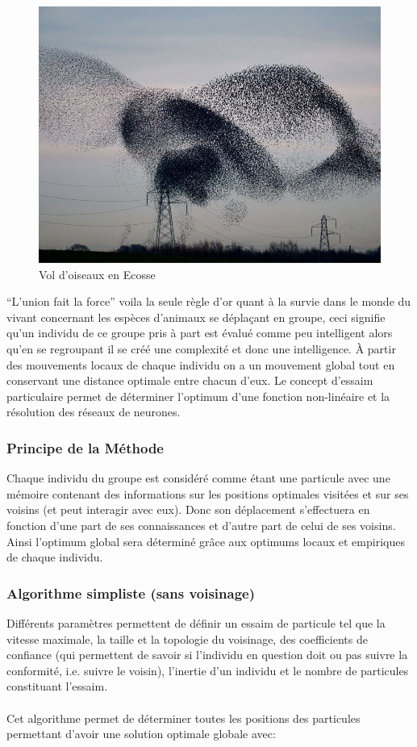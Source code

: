 \documentclass[12pt]{article}
\begin{document}
    \begin{figure}[H]
        \centering\includegraphics[scale=0.4]{vol-groupe-d-oiseaux.jpg}
        \caption{Vol d'oiseaux en Ecosse}
    \end{figure}	

    “L'union fait la force” voila la seule règle d'or quant à la survie dans le monde du vivant concernant les espèces d'animaux se déplaçant en groupe, ceci signifie qu'un individu de ce groupe pris à part est évalué comme peu intelligent alors qu'en se regroupant il se créé une complexité et donc une intelligence. À partir des mouvements locaux de chaque individu on a un mouvement global tout en conservant une distance optimale entre chacun d'eux. Le concept d'essaim particulaire permet de déterminer l'optimum d'une fonction non-linéaire et la résolution des réseaux de neurones.

	\subsubsection{Principe de la Méthode}
    Chaque individu du groupe est considéré comme étant une particule avec une mémoire contenant des informations sur les positions optimales visitées et sur ses voisins (et peut interagir avec eux). Donc son déplacement s'effectuera en fonction d'une part de ses connaissances et d'autre part de celui de ses voisins. Ainsi l'optimum global sera déterminé grâce aux optimums locaux et empiriques de chaque individu.

	\subsubsection{Algorithme simpliste (sans voisinage) }
    Différents paramètres permettent de définir un essaim de particule tel que la vitesse maximale, la taille et la topologie du voisinage, des coefficients de confiance (qui permettent de savoir si l'individu en question doit ou pas suivre la conformité, i.e. suivre le voisin), l'inertie d'un individu et le nombre de particules constituant l'essaim.\\ \\
    \indent Cet algorithme permet de déterminer toutes les positions des particules permettant d'avoir une solution optimale globale avec:
   
\end{document}

